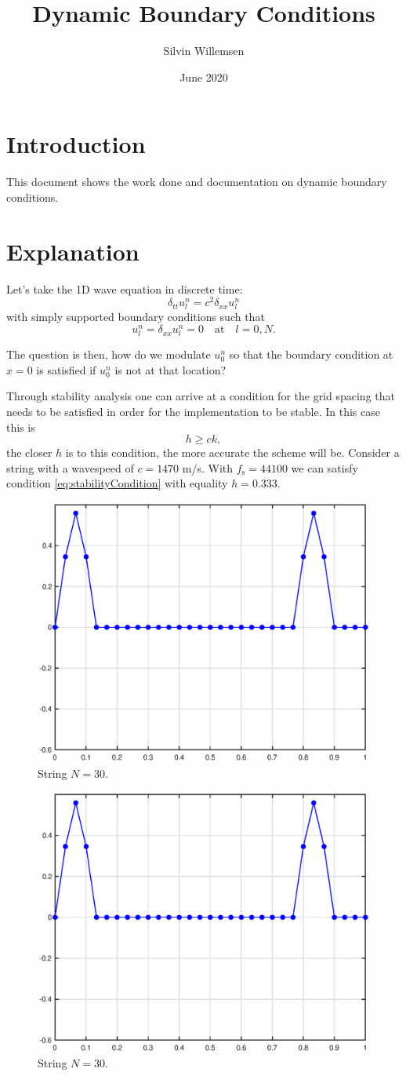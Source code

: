 \documentclass[dvipsnames]{article}
\title{Dynamic Boundary Conditions}
\author{Silvin Willemsen}
\date{June 2020}
\begin{document}
\maketitle

\section{Introduction}
This document shows the work done and documentation on dynamic boundary conditions.

\section{Explanation}
Let's take the 1D wave equation in discrete time:
\begin{equation}
    \delta_{tt}u_l^n=c^2\delta_{xx}u_l^n
\end{equation}
with simply supported boundary conditions such that
\begin{equation}
u_l^n = \delta_{xx}u_l^n = 0 \quad \text{at} \quad l = 0, N.
\end{equation}




The question is then, how do we modulate $u_0^n$ so that the boundary condition at $x=0$ is satisfied if $u_0^n$ is not at that location?

Through stability analysis one can arrive at a condition for the grid spacing that needs to be satisfied in order for the implementation to be stable. In this case this is
\begin{equation}\label{eq:stabilityCondition}
    h \geq ck,
\end{equation}
the closer $h$ is to this condition, the more accurate the scheme will be. 
Consider a string with a wavespeed of $c = 1470$ m/s. With $f_\text{s} = 44100$ we can satisfy condition \eqref{eq:stabilityCondition} with equality $h = 0.333$.

\begin{figure}[h]
\centerline{\includegraphics[width=0.6\columnwidth]{plot1.eps}}
\caption{\label{fig:eta}{String $N=30$.}}
\end{figure}

\begin{figure}[h]
\centerline{\includegraphics[width=0.6\columnwidth]{plot1.eps}}
\caption{\label{fig:eta}{String $N=30$.}}
\end{figure}
\end{document}
